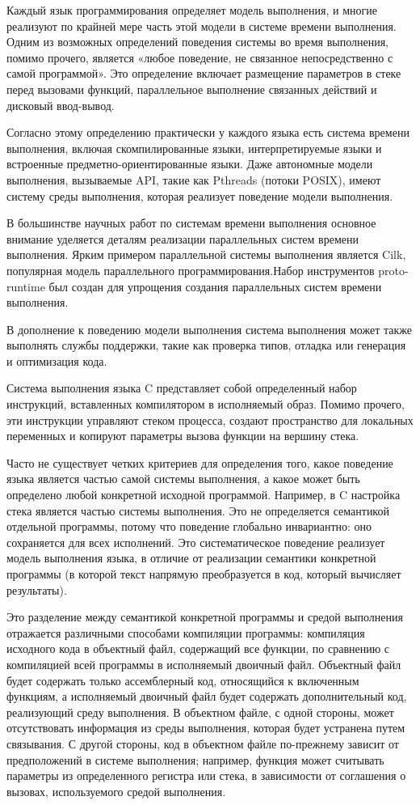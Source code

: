 Каждый язык программирования определяет модель выполнения, и многие реализуют по крайней мере часть этой модели в системе времени выполнения. Одним из возможных определений поведения системы во время выполнения, помимо прочего, является «любое поведение, не связанное непосредственно с самой программой». Это определение включает размещение параметров в стеке перед вызовами функций, параллельное выполнение связанных действий и дисковый ввод-вывод.

Согласно этому определению практически у каждого языка есть система времени выполнения, включая скомпилированные языки, интерпретируемые языки и встроенные предметно-ориентированные языки. Даже автономные модели выполнения, вызываемые API, такие как Pthreads (потоки POSIX), имеют систему среды выполнения, которая реализует поведение модели выполнения.

В большинстве научных работ по системам времени выполнения основное внимание уделяется деталям реализации параллельных систем времени выполнения. Ярким примером параллельной системы выполнения является Cilk, популярная модель параллельного программирования.Набор инструментов proto-runtime был создан для упрощения создания параллельных систем времени выполнения.

В дополнение к поведению модели выполнения система выполнения может также выполнять службы поддержки, такие как проверка типов, отладка или генерация и оптимизация кода.

Система выполнения языка C представляет собой определенный набор инструкций, вставленных компилятором в исполняемый образ. Помимо прочего, эти инструкции управляют стеком процесса, создают пространство для локальных переменных и копируют параметры вызова функции на вершину стека.

Часто не существует четких критериев для определения того, какое поведение языка является частью самой системы выполнения, а какое может быть определено любой конкретной исходной программой. Например, в C настройка стека является частью системы выполнения. Это не определяется семантикой отдельной программы, потому что поведение глобально инвариантно: оно сохраняется для всех исполнений. Это систематическое поведение реализует модель выполнения языка, в отличие от реализации семантики конкретной программы (в которой текст напрямую преобразуется в код, который вычисляет результаты).

Это разделение между семантикой конкретной программы и средой выполнения отражается различными способами компиляции программы: компиляция исходного кода в объектный файл, содержащий все функции, по сравнению с компиляцией всей программы в исполняемый двоичный файл. Объектный файл будет содержать только ассемблерный код, относящийся к включенным функциям, а исполняемый двоичный файл будет содержать дополнительный код, реализующий среду выполнения. В объектном файле, с одной стороны, может отсутствовать информация из среды выполнения, которая будет устранена путем связывания. С другой стороны, код в объектном файле по-прежнему зависит от предположений в системе выполнения; например, функция может считывать параметры из определенного регистра или стека, в зависимости от соглашения о вызовах, используемого средой выполнения.

